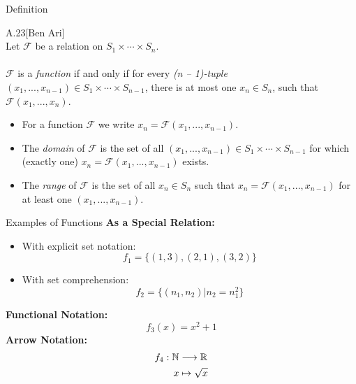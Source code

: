 \begin{slide}[bm=,toc=]{Definition}
\begin{defn}{A.23}[Ben Ari]
~\\
Let $\mathcal{F}$ be a relation on $S_1 \times \cdots \times S_n$.
\\~\\
\pause
$\mathcal{F}$ is a \emph{function} if and only if for every \emph{(n -- 1)-tuple}
$(x_1,...,x_{n-1}) \in S_1 \times \cdots \times S_{n-1}$, there is at most
one $x_n \in S_n$, such that $\mathcal{F}(x_1,...,x_n)$.
\begin{itemize}
\item<3-> For a function $\mathcal{F}$ we write $x_n = \mathcal{F}(x_1,...,x_{n-1})$.
\item<4-> The \emph{domain} of $\mathcal{F}$ is the set of all
$(x_1,...,x_{n-1})\in S_1 \times \cdots \times S_{n-1}$ for which (exactly one)
$x_n = \mathcal{F}(x_1,...,x_{n-1})$ exists.
\item<5->The \emph{range} of $\mathcal{F}$ is the set of all $x_n \in S_n$ such
that $x_n = \mathcal{F}(x_1,...,x_{n-1})$ for at least one $(x_1,...,x_{n-1})$. 
\end{itemize}
\end{defn}
\end{slide}

\begin{slide}[bm=,toc=]{Examples of Functions}
\textbf{As a Special Relation:}
\begin{itemize}
\item<2-> With explicit set notation: \[f_1 = \{(1,3),(2,1),(3,2)\}\]
\vspace{-5mm}
\item<3-> With set comprehension: \[f_2 = \{(n_1,n_2)|n_2 = n_1^2\}\]
\end{itemize}
\pause[3]
\textbf{Functional Notation:}
\vspace{-3mm}
\[
  f_3(x) = x^2 + 1
  \]
\vspace{-5mm}
\pause
\textbf{Arrow Notation:}
\vspace{-3mm}
\begin{align*}
f_4:\mathbb{N} &\longrightarrow \mathbb{R} \\
    x &\mapsto \sqrt{x}
\end{align*}

\end{slide}

